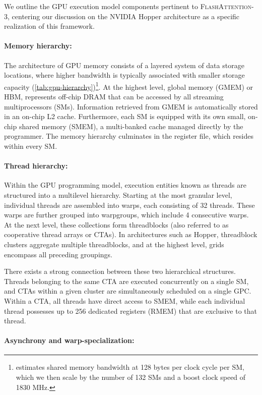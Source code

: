 We outline the GPU execution model components pertinent to \textsc{FlashAttention-3}, centering our discussion on the NVIDIA Hopper architecture as a specific realization of this framework.

\paragraph{Memory hierarchy:} The architecture of GPU memory consists of a layered system of data storage locations, where higher bandwidth is typically associated with smaller storage capacity (\cref{tab:gpu-hierarchy})\footnote{\citet{luo2024benchmarking} estimates shared memory bandwidth at 128 bytes per clock cycle per SM, which we then scale by the number of 132 SMs and a boost clock speed of 1830 MHz.}. At the highest level, global memory (GMEM) or HBM, represents off-chip DRAM that can be accessed by all streaming multiprocessors (SMs). Information retrieved from GMEM is automatically stored in an on-chip L2 cache. Furthermore, each SM is equipped with its own small, on-chip shared memory (SMEM), a multi-banked cache managed directly by the programmer. The memory hierarchy culminates in the register file, which resides within every SM.

\paragraph{Thread hierarchy:} Within the GPU programming model, execution entities known as threads are structured into a multilevel hierarchy. Starting at the most granular level, individual threads are assembled into warps, each consisting of 32 threads. These warps are further grouped into warpgroups, which include 4 consecutive warps. At the next level, these collections form threadblocks (also referred to as cooperative thread arrays or CTAs). In architectures such as Hopper, threadblock clusters aggregate multiple threadblocks, and at the highest level, grids encompass all preceding groupings.

There exists a strong connection between these two hierarchical structures. Threads belonging to the same CTA are executed concurrently on a single SM, and CTAs within a given cluster are simultaneously scheduled on a single GPC. Within a CTA, all threads have direct access to SMEM, while each individual thread possesses up to 256 dedicated registers (RMEM) that are exclusive to that thread.

\paragraph{Asynchrony and warp-specialization:}

